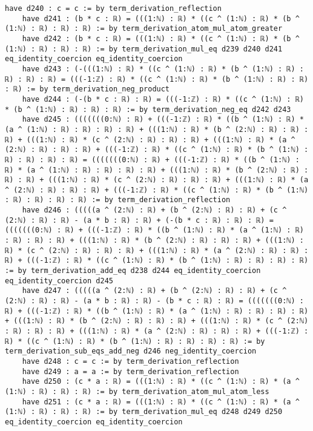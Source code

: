 \documentclass{article}
\begin{document}
\begin{tcolorbox}[colback=white!10, width=\linewidth]
\begin{lstlisting}[language=Lean4]
    have d240 : c = c := by term_derivation_reflection
    have d241 : (b * c : ℝ) = (((1:ℕ) : ℝ) * ((c ^ (1:ℕ) : ℝ) * (b ^ (1:ℕ) : ℝ) : ℝ) : ℝ) := by term_derivation_atom_mul_atom_greater
    have d242 : (b * c : ℝ) = (((1:ℕ) : ℝ) * ((c ^ (1:ℕ) : ℝ) * (b ^ (1:ℕ) : ℝ) : ℝ) : ℝ) := by term_derivation_mul_eq d239 d240 d241 eq_identity_coercion eq_identity_coercion
    have d243 : (-(((1:ℕ) : ℝ) * ((c ^ (1:ℕ) : ℝ) * (b ^ (1:ℕ) : ℝ) : ℝ) : ℝ) : ℝ) = (((-1:ℤ) : ℝ) * ((c ^ (1:ℕ) : ℝ) * (b ^ (1:ℕ) : ℝ) : ℝ) : ℝ) := by term_derivation_neg_product
    have d244 : (-(b * c : ℝ) : ℝ) = (((-1:ℤ) : ℝ) * ((c ^ (1:ℕ) : ℝ) * (b ^ (1:ℕ) : ℝ) : ℝ) : ℝ) := by term_derivation_neg_eq d242 d243
    have d245 : (((((((0:ℕ) : ℝ) + (((-1:ℤ) : ℝ) * ((b ^ (1:ℕ) : ℝ) * (a ^ (1:ℕ) : ℝ) : ℝ) : ℝ) : ℝ) + (((1:ℕ) : ℝ) * (b ^ (2:ℕ) : ℝ) : ℝ) : ℝ) + (((1:ℕ) : ℝ) * (c ^ (2:ℕ) : ℝ) : ℝ) : ℝ) + (((1:ℕ) : ℝ) * (a ^ (2:ℕ) : ℝ) : ℝ) : ℝ) + (((-1:ℤ) : ℝ) * ((c ^ (1:ℕ) : ℝ) * (b ^ (1:ℕ) : ℝ) : ℝ) : ℝ) : ℝ) = (((((((0:ℕ) : ℝ) + (((-1:ℤ) : ℝ) * ((b ^ (1:ℕ) : ℝ) * (a ^ (1:ℕ) : ℝ) : ℝ) : ℝ) : ℝ) + (((1:ℕ) : ℝ) * (b ^ (2:ℕ) : ℝ) : ℝ) : ℝ) + (((1:ℕ) : ℝ) * (c ^ (2:ℕ) : ℝ) : ℝ) : ℝ) + (((1:ℕ) : ℝ) * (a ^ (2:ℕ) : ℝ) : ℝ) : ℝ) + (((-1:ℤ) : ℝ) * ((c ^ (1:ℕ) : ℝ) * (b ^ (1:ℕ) : ℝ) : ℝ) : ℝ) : ℝ) := by term_derivation_reflection
    have d246 : (((((a ^ (2:ℕ) : ℝ) + (b ^ (2:ℕ) : ℝ) : ℝ) + (c ^ (2:ℕ) : ℝ) : ℝ) - (a * b : ℝ) : ℝ) + (-(b * c : ℝ) : ℝ) : ℝ) = (((((((0:ℕ) : ℝ) + (((-1:ℤ) : ℝ) * ((b ^ (1:ℕ) : ℝ) * (a ^ (1:ℕ) : ℝ) : ℝ) : ℝ) : ℝ) + (((1:ℕ) : ℝ) * (b ^ (2:ℕ) : ℝ) : ℝ) : ℝ) + (((1:ℕ) : ℝ) * (c ^ (2:ℕ) : ℝ) : ℝ) : ℝ) + (((1:ℕ) : ℝ) * (a ^ (2:ℕ) : ℝ) : ℝ) : ℝ) + (((-1:ℤ) : ℝ) * ((c ^ (1:ℕ) : ℝ) * (b ^ (1:ℕ) : ℝ) : ℝ) : ℝ) : ℝ) := by term_derivation_add_eq d238 d244 eq_identity_coercion eq_identity_coercion d245
    have d247 : (((((a ^ (2:ℕ) : ℝ) + (b ^ (2:ℕ) : ℝ) : ℝ) + (c ^ (2:ℕ) : ℝ) : ℝ) - (a * b : ℝ) : ℝ) - (b * c : ℝ) : ℝ) = (((((((0:ℕ) : ℝ) + (((-1:ℤ) : ℝ) * ((b ^ (1:ℕ) : ℝ) * (a ^ (1:ℕ) : ℝ) : ℝ) : ℝ) : ℝ) + (((1:ℕ) : ℝ) * (b ^ (2:ℕ) : ℝ) : ℝ) : ℝ) + (((1:ℕ) : ℝ) * (c ^ (2:ℕ) : ℝ) : ℝ) : ℝ) + (((1:ℕ) : ℝ) * (a ^ (2:ℕ) : ℝ) : ℝ) : ℝ) + (((-1:ℤ) : ℝ) * ((c ^ (1:ℕ) : ℝ) * (b ^ (1:ℕ) : ℝ) : ℝ) : ℝ) : ℝ) := by term_derivation_sub_eqs_add_neg d246 neg_identity_coercion
    have d248 : c = c := by term_derivation_reflection
    have d249 : a = a := by term_derivation_reflection
    have d250 : (c * a : ℝ) = (((1:ℕ) : ℝ) * ((c ^ (1:ℕ) : ℝ) * (a ^ (1:ℕ) : ℝ) : ℝ) : ℝ) := by term_derivation_atom_mul_atom_less
    have d251 : (c * a : ℝ) = (((1:ℕ) : ℝ) * ((c ^ (1:ℕ) : ℝ) * (a ^ (1:ℕ) : ℝ) : ℝ) : ℝ) := by term_derivation_mul_eq d248 d249 d250 eq_identity_coercion eq_identity_coercion

\end{lstlisting}
\end{tcolorbox}
\end{document}
